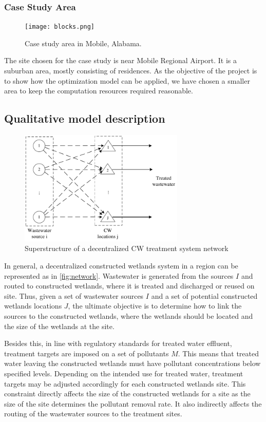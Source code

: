 \documentclass[preprint,12pt,authoryear]{elsarticle}
\begin{document}
\subsubsection{Case Study Area}
\begin{figure}[!htb]
	\centering
	\texttt{[image: blocks.png]}
	\caption{Case study area in Mobile, Alabama.}
	\label{fig:blocks}
\end{figure}

The site chosen for the case study is near Mobile Regional Airport. It is a suburban area, mostly consisting of residences. As the objective of the project is to show how the optimization model can be applied, we have chosen a smaller area to keep the computation resources required reasonable. 

\subsection{Qualitative model description}\label{section:problemstatement}

\begin{figure}[!htpb]
	\centering
	\includegraphics[width=0.7\textwidth]{CWnetwork.pdf}
	\caption{Superstructure of a decentralized CW treatment system network}
	\label{fig:network}
\end{figure}

In general, a decentralized constructed wetlands system in a region can be represented as in \autoref{fig:network}. Wastewater is generated from the sources $I$ and routed to constructed wetlands, where it is treated and discharged or reused on site. Thus, given a set of wastewater sources $I$ and a set of potential constructed wetlands locations $J$, the ultimate objective is to determine how to link the sources to the constructed wetlands, where the wetlands should be located and the size of the wetlands at the site. 

Besides this, in line with regulatory standards for treated water effluent, treatment targets are imposed on a set of pollutants $M$. This means that treated water leaving the constructed wetlands must have pollutant concentrations below specified levels. Depending on the intended use for treated water, treatment targets may be adjusted accordingly for each constructed wetlands site. This constraint directly affects the size of the constructed wetlands for a site as the size of the site determines the pollutant removal rate. It also indirectly affects the routing of the wastewater sources to the treatment sites. 
\end{document}

